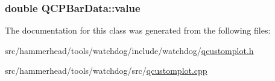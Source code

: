 \subsubsection[{\texorpdfstring{value}{value}}]{\setlength{\rightskip}{0pt plus 5cm}double Q\+C\+P\+Bar\+Data\+::value}\hypertarget{classQCPBarData_acab57005d8916d61b64e9ddef6113b60}{}\label{classQCPBarData_acab57005d8916d61b64e9ddef6113b60}


The documentation for this class was generated from the following files\+:\begin{DoxyCompactItemize}
\item 
src/hammerhead/tools/watchdog/include/watchdog/\hyperlink{qcustomplot_8h}{qcustomplot.\+h}\item 
src/hammerhead/tools/watchdog/src/\hyperlink{qcustomplot_8cpp}{qcustomplot.\+cpp}\end{DoxyCompactItemize}
